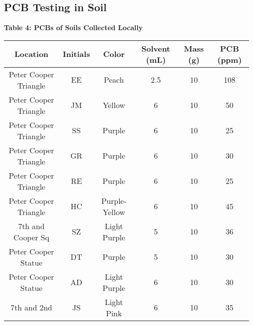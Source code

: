 \subsection{PCB Testing in Soil}
\begin{center}
\vspace{5mm}
{\large {\bf Table 4: PCBs of Soils Collected Locally\\}}
\vspace{2mm}
\begin{tabular}{|cccccc|}
    \hline
    \textbf{Location}     & \textbf{Initials} & \textbf{Color} & \textbf{Solvent (mL)} & \textbf{Mass (g)} & \textbf{PCB (ppm)}  \\\hline
    Peter Cooper Triangle & EE                & Peach          & 2.5                             & 10                     & 108                 \\
    Peter Cooper Triangle & JM                & Yellow         & 6                               & 10                     & 50                  \\
    Peter Cooper Triangle & SS                & Purple         & 6                               & 10                     & 25                  \\
    Peter Cooper Triangle & GR                & Purple         & 6                               & 10                     & 30                  \\
    Peter Cooper Triangle & RE                & Purple         & 6                               & 10                     & 25                  \\
    Peter Cooper Triangle & HC                & Purple-Yellow  & 6                               & 10                     & 45                  \\
    7th and Cooper Sq     & SZ                & Light Purple   & 5                               & 10                     & 36                  \\
    Peter Cooper Statue   & DT                & Purple         & 5                               & 10                     & 30                  \\
    Peter Cooper Statue   & AD                & Light Purple   & 6                               & 10                     & 30                  \\
    7th and 2nd           & JS                & Light Pink     & 6                               & 10                     & 35                  \\

\end{tabular}
\end{center}

